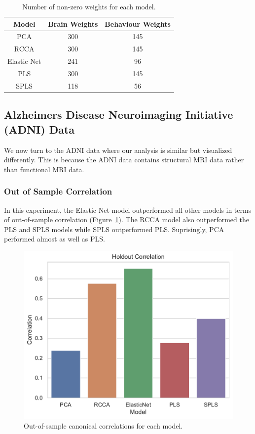 \begin{table}[h]
\centering
\caption{Number of non-zero \gls{weights} for each model.}
\begin{tabular}{|c|c|c|}
\hline
Model &  Brain Weights &  Behaviour Weights \\
\hline
PCA & 300 & 145 \\
RCCA & 300 & 145 \\
Elastic Net & 241 & 96 \\
PLS & 300 & 145 \\
SPLS & 118 & 56 \\
\hline
\end{tabular}\label{tab:brain-behaviour-weights-hcp}
\end{table}

\newpage
\subsection{Alzheimers Disease Neuroimaging Initiative (ADNI) Data}\label{subsec:adni}

We now turn to the ADNI data where our analysis is similar but visualized differently.
This is because the ADNI data contains structural MRI data rather than functional MRI data.

\subsubsection{Out of Sample Correlation}

In this experiment, the Elastic Net model outperformed all other models in terms of out-of-sample correlation (Figure~\ref{fig:performance}).
The RCCA model also outperformed the PLS and SPLS models while SPLS outperformed PLS.
Suprisingly, PCA performed almost as well as PLS.

\begin{figure}
\centering
\includegraphics[width=0.5\linewidth]{figures/adni/holdout_correlations}
\caption{Out-of-sample canonical correlations for each model.}\label{fig:performance}
\end{figure}

